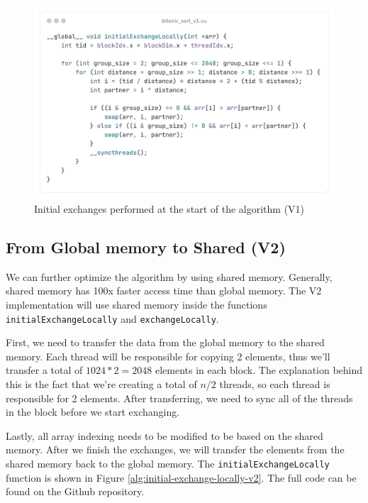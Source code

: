 \documentclass{article}
\begin{document}
\begin{figure}[H]
    \centering
    \includegraphics[width=1\textwidth]{initial-exchange-locally-v1.png}
    \caption{Initial exchanges performed at the start of the algorithm (V1)}
    \label{alg:initial-exchange-locally-v1}
\end{figure}

\subsection{From Global memory to Shared (V2)}
We can further optimize the algorithm by using shared memory. Generally, shared memory has 100x faster access time than global memory.
The V2 implementation will use shared memory inside the functions \texttt{initialExchangeLocally} and \texttt{exchangeLocally}.

First, we need to transfer the data from the global memory to the shared memory. Each thread will be responsible for copying
2 elements, thus we'll transfer a total of $1024*2 = 2048$ elements in each block. The explanation behind this is the fact that we're creating
a total of $n/2$ threads, so each thread is responsible for 2 elements. After transferring, we need to sync all of the threads in the block 
before we start exchanging.

Lastly, all array indexing needs to be modified to be based on the shared memory. After we finish the exchanges, we will transfer
the elements from the shared memory back to the global memory.
The \texttt{initialExchangeLocally} function is shown in Figure \ref{alg:initial-exchange-locally-v2}.
The full code can be found on the Github repository.
\end{document}
